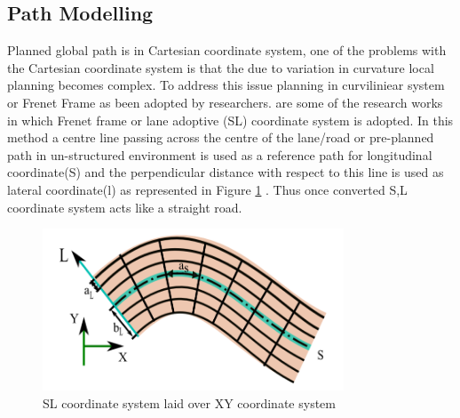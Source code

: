 \subsection{Path Modelling} \label{frenet_frame}

 Planned global path is in Cartesian coordinate system, one of the problems with the Cartesian coordinate system is that the due to variation in curvature local planning becomes complex. To address this issue planning in curviliniear system or Frenet Frame as been adopted by researchers. \cite{traj_planner_optimization} \cite{spatio_temporal_state_lattice} \cite{diss_shui_phd_thesis} \cite{real_time_traj_plan_article} \cite{volvo_reactive_traj} \cite{curvilinear_System_Automated_Drv} are some of the research works in which Frenet frame or lane adoptive (SL) coordinate system is adopted. In this method a centre line passing across the centre of the lane/road or pre-planned path in un-structured environment is used as a reference path for longitudinal coordinate(S) and the perpendicular distance with respect to this line is used as lateral coordinate(l) as represented in Figure \ref{sl_over_xy} \cite{diss_shui_phd_thesis}. Thus once converted S,L coordinate system acts like a straight road. 
 
 \begin{figure}[H]
    \centering
    \includegraphics[width=0.8\textwidth]{Images/sl_over_xy.png}
    \caption{SL coordinate system laid over XY coordinate system}
    \label{sl_over_xy}
\end{figure}
 

